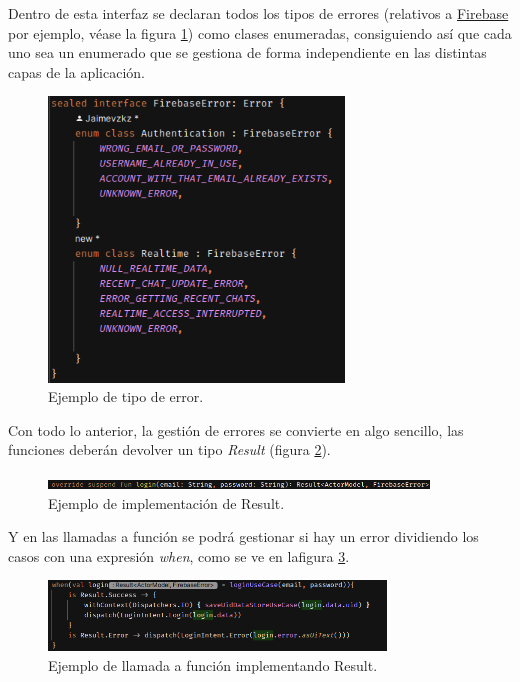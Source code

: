 Dentro de esta interfaz se declaran todos los tipos de errores (relativos a \hyperlink{subsec:firebase}{Firebase} por ejemplo, véase la figura \ref{fig:ejemplo_tipo_error}) como clases enumeradas, consiguiendo así que cada uno sea un enumerado que se gestiona de forma independiente en las distintas capas de la aplicación.
\begin{figure}[h]
    \centering
    \includegraphics[width = 0.7\textwidth]{Imagenes/Fuentes/ejemplo_tipo_error.png}
    \caption{Ejemplo de tipo de error.}
    \label{fig:ejemplo_tipo_error}
\end{figure}

Con todo lo anterior, la gestión de errores se convierte en algo sencillo, las funciones deberán devolver un tipo \textit{Result} (figura \ref{fig:ejemplo_impl_result}).
\newpage
\begin{figure}[h]
    \centering
    \includegraphics[width = 0.9\textwidth]{Imagenes/Fuentes/ejemplo_impl_result.png}
    \caption{Ejemplo de implementación de Result.}
    \label{fig:ejemplo_impl_result}
\end{figure}

Y en las llamadas a función se podrá gestionar si hay un error dividiendo los casos con una expresión
\textit{when}\hyperlink{cap:biblio}{}, como se ve en lafigura \ref{fig:llamada_funcion_result}.
\begin{figure}[h]
    \centering
    \includegraphics[width = 0.8\textwidth]{Imagenes/Fuentes/llamada_funcion_result.png}
    \caption{Ejemplo de llamada a función implementando Result.}
    \label{fig:llamada_funcion_result}
\end{figure}